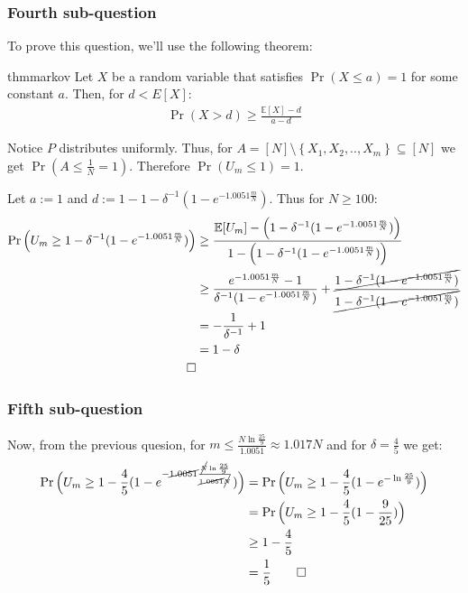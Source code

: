 \documentclass[a4paper]{article}
\newcommand{\lc}{\left\{}
\newcommand{\rc}{\right\}}
\newcommand{\E}{\mathbb{E}}
\newcommand{\qedsquare}{\tag*{$\square$}}
\newcommand{\fn}{\frac{1}{N}}
\newcommand{\mn}{\frac{m}{N}}
\newcommand{\e}{e^{-1.0051 \mn}}
\newcommand{\df}{1-\delta^{-1}(1-\e)}
\begin{document}
\newpage

\subsubsection {Fourth sub-question}

To prove this question, we'll use the following theorem: 
\begin{restatable}{thm}{markov}
    \label{thm:markov}
    Let $X$ be a random variable that satisfies $ \Pr(X \leq a) = 1 $ for some constant $a$.
    Then, for $ d < E[X] $:
    \begin{align*}
        \Pr( X > d) \geq \frac{\E[X] - d}{a - d}
    \end{align*}
\end{restatable}

Notice $P$ distributes uniformly. Thus, for $ A = [N] \setminus \lc X_1, X_2, .., X_m \rc \subseteq [N] $
we get $ \Pr ( A \leq \fn = 1 ) $. Therefore $ \Pr ( U_m \leq 1 ) = 1 $.

Let $ a := 1 $ and $ d := 1-\df $. Thus for $ N \geq 100 $:
\begin{align*}
    \Pr \Big( U_m \geq \df \Big) &\geq \frac{ \E[U_m] - \Big( \df \Big) }{ 1 - \Big( \df \Big) } \\
    &\geq \frac{\e-1}{\delta^{-1}(1-\e)} + \frac{\cancel{\df}}{\cancel{\df}} \\
    &= - \frac{1}{\delta^{-1}} + 1 \\
    &= 1-\delta \\
    \qedsquare
\end{align*}

\subsubsection {Fifth sub-question}

Now, from the previous quesion, for $ m \leq \frac{ N \ln \frac{25}{9} }{1.0051} \approx 1.017 N $ and for $ \delta=\frac{4}{5} $ we get: \\
\begin{align*}
    \Pr \Big( U_m \geq 1 - \frac{4}{5} ( 1 - e^{ - \cancel{1.0051}
        \frac{ \cancel{N} \ln \frac{25}{9} }{\cancel{1.0051} \cancel{N}}} ) \Big)
    &= \Pr \Big( U_m \geq 1 - \frac{4}{5} ( 1 - e^{ - \ln \frac{25}{9} } ) \Big) \\
    &= \Pr \Big( U_m \geq 1 - \frac{4}{5} ( 1 - \frac{9}{25} ) \Big) \\
    &\geq 1 - \frac{4}{5} \\
    &= \frac{1}{5}
    \qedsquare
\end{align*}
\end{document}
